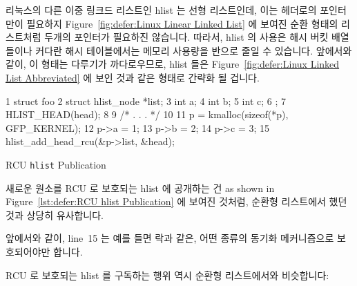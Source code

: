 리눅스의 다른 이중 링크드 리스트인 hlist 는 선형 리스트인데, 이는 헤더로의
포인터만이 필요하지
Figure~\ref{fig:defer:Linux Linear Linked List} 에 보여진 순환 형태의
리스트처럼 두개의 포인터가 필요하진 않습니다.
따라서, hlist 의 사용은 해시 버킷 배열들이나 커다란 해시 테이블에서는 메모리
사용량을 반으로 줄일 수 있습니다.
앞에서와 같이, 이 형태는 다루기가 까다로우므로, hlist 들은
Figure~\ref{fig:defer:Linux Linked List Abbreviated} 에 보인 것과 같은 형태로
간략화 될 겁니다.

\begin{listing}[tbp]
{ \scriptsize
\begin{verbbox}
  1 struct foo {
  2   struct hlist_node *list;
  3   int a;
  4   int b;
  5   int c;
  6 };
  7 HLIST_HEAD(head);
  8
  9 /* . . . */
 10
 11 p = kmalloc(sizeof(*p), GFP_KERNEL);
 12 p->a = 1;
 13 p->b = 2;
 14 p->c = 3;
 15 hlist_add_head_rcu(&p->list, &head);
\end{verbbox}
}
\centering
\theverbbox
\caption{RCU {\tt hlist} Publication}
\label{lst:defer:RCU hlist Publication}
\end{listing}

새로운 원소를 RCU 로 보호되는 hlist 에 공개하는 건
as shown in Figure~\ref{lst:defer:RCU hlist Publication} 에 보여진 것처럼,
순환형 리스트에서 했던 것과 상당히 유사합니다.

앞에서와 같이, line~15 는 예를 들면 락과 같은, 어떤 종류의 동기화 메커니즘으로
보호되어야만 합니다.

RCU 로 보호되는 hlist 를 구독하는 행위 역시 순환형 리스트에서와 비슷합니다:

